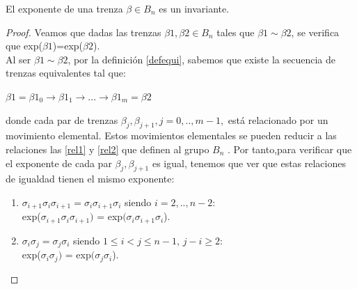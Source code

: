 \begin{pro}
	El exponente de una trenza $\beta \in B_{n}$ es un invariante. 
	\begin{proof}
		Veamos que dadas las trenzas $\beta1,\beta2 \in B_{n}$ tales que $\beta1 \sim \beta2$, se verifica que exp($\beta1$)=exp($\beta2$).\\
		
		Al ser $\beta1 \sim \beta2$, por la definición \ref{defequi}, sabemos que existe la secuencia de trenzas equivalentes tal que: 
		\begin{center}
			$ \beta1 = \beta1_{0} \rightarrow \beta1_{1} \rightarrow ... \rightarrow \beta1_{m}=\beta2$ 
		\end{center}
	    donde cada par de trenzas $ \beta_{j}, \beta_{j+1}, j=0,..,m-1, $ está relacionado por un movimiento elemental. Estos movimientos elementales se pueden reducir a las relaciones las  \ref{rel1} y \ref{rel2} que definen al grupo $ B_{n} $ . Por tanto,para verificar que el exponente de cada par $ \beta_{j}, \beta_{j+1}$ es igual, tenemos que ver que estas relaciones de igualdad tienen el mismo exponente:
	    
	    \begin{enumerate}
	    \item $\sigma_{i+1}\sigma_{i}\sigma_{i+1} =\sigma_{i}\sigma_{i+1}\sigma_{i} $ siendo $i=2,..,n-2 $:\\
	    exp($ \sigma_{i+1}\sigma_{i}\sigma_{i+1})$ = exp$(\sigma_{i}\sigma_{i+1}\sigma_{i} $).
	    \item $\sigma_{i}\sigma_{j}=\sigma_{j}\sigma_{i}$ siendo $1 \le i < j \le n-1 $, $j-i \geq 2$:\\
	    exp($\sigma_{i}\sigma_{j})$ = exp$(\sigma_{j}\sigma_{i}$).  	
	    \end{enumerate}
	\end{proof}
\end{pro}


